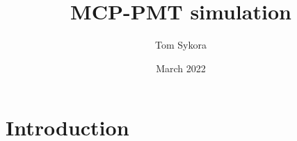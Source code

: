 \documentclass{article}
\title{MCP-PMT simulation}
\author{Tom Sykora}
\date{March 2022}
\begin{document}
\maketitle

\section{Introduction}
\end{document}
